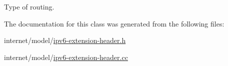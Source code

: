 Type of routing. 



The documentation for this class was generated from the following files\+:\begin{DoxyCompactItemize}
\item 
internet/model/\hyperlink{ipv6-extension-header_8h}{ipv6-\/extension-\/header.\+h}\item 
internet/model/\hyperlink{ipv6-extension-header_8cc}{ipv6-\/extension-\/header.\+cc}\end{DoxyCompactItemize}
